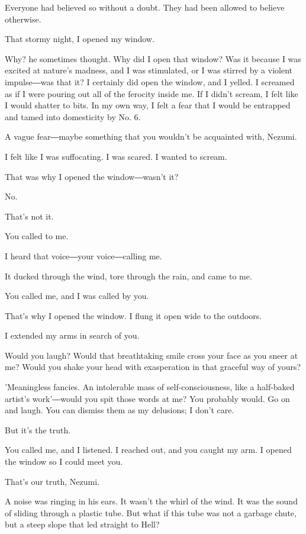 Everyone had believed so without a doubt. They had been allowed to
believe otherwise.

That stormy night, I opened my window.

Why? he sometimes thought. Why did I open that window? Was it because I
was excited at nature's madness, and I was stimulated, or I was stirred
by a violent impulse―was that it? I certainly did open the window, and I
yelled. I screamed as if I were pouring out all of the ferocity inside
me. If I didn't scream, I felt like I would shatter to bits. In my own
way, I felt a fear that I would be entrapped and tamed into domesticity
by No. 6.

A vague fear―maybe something that you wouldn't be acquainted with,
Nezumi.

I felt like I was suffocating. I was scared. I wanted to scream.

That was why I opened the window―wasn't it?

No.

That's not it.

You called to me.

I heard that voice―your voice―calling me.

It ducked through the wind, tore through the rain, and came to me.

You called me, and I was called by you.

That's why I opened the window. I flung it open wide to the outdoors.

I extended my arms in search of you.

Would you laugh? Would that breathtaking smile cross your face as you
sneer at me? Would you shake your head with exasperation in that
graceful way of yours?

'Meaningless fancies. An intolerable mass of self-consciousness, like a
half-baked artist's work'―would you spit those words at me? You probably
would. Go on and laugh. You can dismiss them as my delusions; I don't
care.

But it's the truth.

You called me, and I listened. I reached out, and you caught my arm. I
opened the window so I could meet you.

That's our truth, Nezumi.

A noise was ringing in his ears. It wasn't the whirl of the wind. It was
the sound of sliding through a plastic tube. But what if this tube was
not a garbage chute, but a steep slope that led straight to Hell?


